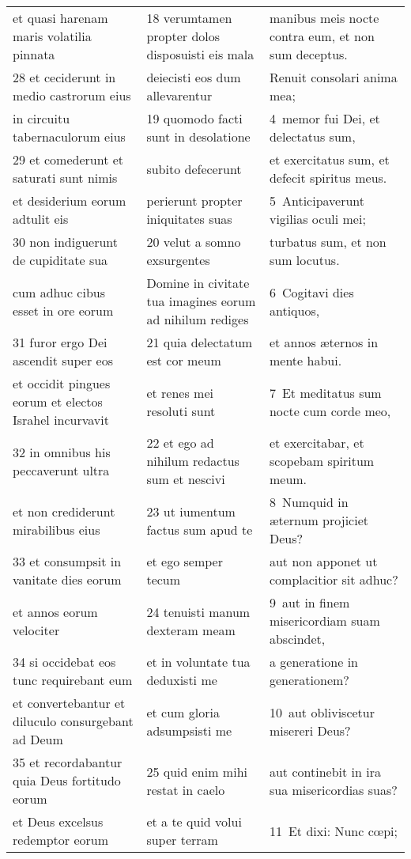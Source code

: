 \documentclass{article}
\begin{document}
\begin{longtable}{@{}p{}p{}p{}@{}}
et quasi harenam maris volatilia pinnata	&	18 verumtamen propter dolos disposuisti eis mala	&	manibus meis nocte contra eum, et non sum deceptus.	\\
28 et ceciderunt in medio castrorum eius	&	deiecisti eos dum allevarentur	&	Renuit consolari anima mea;	\\
in circuitu tabernaculorum eius	&	19 quomodo facti sunt in desolatione	&	4 memor fui Dei, et delectatus sum,	\\
29 et comederunt et saturati sunt nimis	&	subito defecerunt	&	et exercitatus sum, et defecit spiritus meus.	\\
et desiderium eorum adtulit eis	&	perierunt propter iniquitates suas	&	5 Anticipaverunt vigilias oculi mei;	\\
30 non indiguerunt de cupiditate sua	&	20 velut a somno exsurgentes	&	turbatus sum, et non sum locutus.	\\
cum adhuc cibus esset in ore eorum	&	Domine in civitate tua imagines eorum ad nihilum rediges	&	6 Cogitavi dies antiquos,	\\
31 furor ergo Dei ascendit super eos	&	21 quia delectatum est cor meum	&	et annos æternos in mente habui.	\\
et occidit pingues eorum et electos Israhel incurvavit	&	et renes mei resoluti sunt	&	7 Et meditatus sum nocte cum corde meo,	\\
32 in omnibus his peccaverunt ultra	&	22 et ego ad nihilum redactus sum et nescivi	&	et exercitabar, et scopebam spiritum meum.	\\
et non crediderunt mirabilibus eius	&	23 ut iumentum factus sum apud te	&	8 Numquid in æternum projiciet Deus?	\\
33 et consumpsit in vanitate dies eorum	&	et ego semper tecum	&	aut non apponet ut complacitior sit adhuc?	\\
et annos eorum velociter	&	24 tenuisti manum dexteram meam	&	9 aut in finem misericordiam suam abscindet,	\\
34 si occidebat eos tunc requirebant eum	&	et in voluntate tua deduxisti me	&	a generatione in generationem?	\\
et convertebantur et diluculo consurgebant ad Deum	&	et cum gloria adsumpsisti me	&	10 aut obliviscetur misereri Deus?	\\
35 et recordabantur quia Deus fortitudo eorum	&	25 quid enim mihi restat in caelo	&	aut continebit in ira sua misericordias suas?	\\
et Deus excelsus redemptor eorum	&	et a te quid volui super terram	&	11 Et dixi: Nunc cœpi;	\\

\end{longtable}
\end{document}
